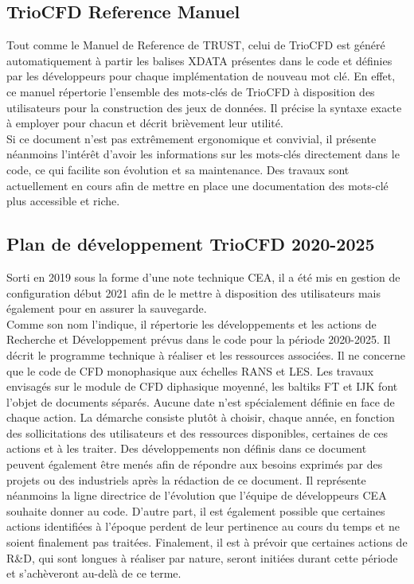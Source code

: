 \subsection{TrioCFD Reference Manuel}
Tout comme le Manuel de Reference de TRUST, celui de TrioCFD est généré automatiquement à partir les balises XDATA présentes dans le code et définies par les développeurs pour chaque implémentation de nouveau mot clé. En effet, ce manuel répertorie l'ensemble des mots-clés de TrioCFD à disposition des utilisateurs pour la construction des jeux de données. Il précise la syntaxe exacte à employer pour chacun et décrit brièvement leur utilité.\\
Si ce document n'est pas extrêmement ergonomique et convivial, il présente néanmoins l'intérêt d'avoir les informations sur les mots-clés directement dans le code, ce qui facilite son évolution et sa maintenance. Des travaux sont actuellement en cours afin de mettre en place une documentation des mots-clé plus accessible et riche.
\subsection{Plan de d\'eveloppement TrioCFD 2020-2025}
Sorti en 2019 sous la forme d'une note technique CEA, il a été mis en gestion de configuration début 2021 afin de le mettre à disposition des utilisateurs mais également pour en assurer la sauvegarde.\\
Comme son nom l'indique, il répertorie les développements et les actions de Recherche et Développement prévus dans le code pour la période 2020-2025. Il décrit le programme technique à réaliser et les ressources associées. Il ne concerne que le code de CFD monophasique aux échelles RANS et LES. Les travaux envisagés sur le module de CFD diphasique moyenné, les baltiks FT et IJK font l'objet de documents séparés. Aucune date n'est spécialement définie en face de chaque action. La démarche consiste plutôt à choisir, chaque année, en fonction des sollicitations des utilisateurs et des ressources disponibles, certaines de ces actions et à les traiter. Des développements non définis dans ce document peuvent également être menés afin de répondre aux besoins exprimés par des projets ou des industriels après la rédaction de ce document. Il représente néanmoins la ligne directrice de l'évolution que l'équipe de développeurs CEA souhaite donner au code. D'autre part, il est également possible que certaines actions identifiées à l'époque perdent de leur pertinence au cours du temps et ne soient finalement pas traitées. Finalement, il est à prévoir que certaines actions de R\&D, qui sont longues à réaliser par nature, seront initiées durant cette période et
s'achèveront au-delà de ce terme.

